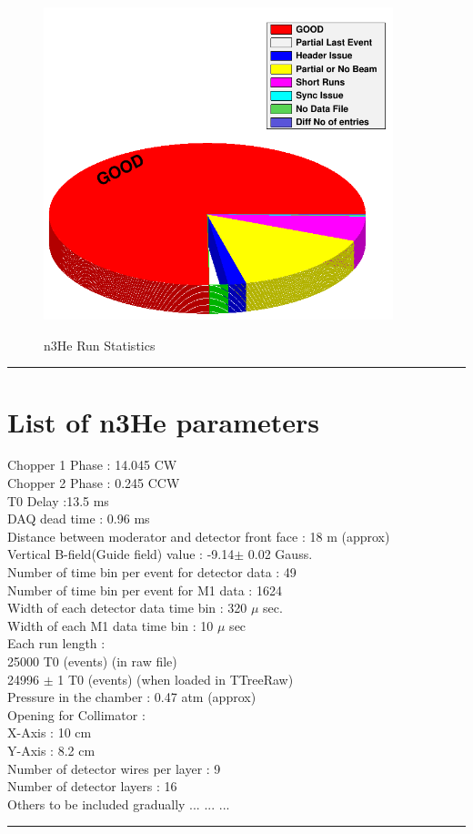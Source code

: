 \documentclass[12pt]{article}
\begin{document}
\begin{figure}[htb]
\centering
\includegraphics[width=4in]{n3he_run_status.png}\\
\caption{n3He Run Statistics}\label{f5}
\end{figure}   

\noindent
{\color{red} \rule{\linewidth}{1mm} }

\newpage
\section{List of n3He parameters}

Chopper 1 Phase : 14.045 CW \\
Chopper 2 Phase : 0.245 CCW \\
T0 Delay :13.5 ms \\
DAQ dead time : 0.96 ms \\
Distance between moderator and detector front face : 18 m (approx) \\
Vertical B-field(Guide field) value : -9.14$\pm$ 0.02 Gauss.\\
Number of time bin per event for detector data : 49\\
Number of time bin per event for M1 data : 1624\\
Width of each detector data time bin : 320 $\mu$ sec.\\
Width of each M1 data time bin : 10 $\mu$ sec\\
Each run length : \\
\hspace{5cm} 25000 T0 (events) (in raw file)\\
\hspace{5cm} 24996 $\pm$ 1 T0 (events) (when loaded in TTreeRaw)\\
Pressure in the chamber : 0.47 atm (approx) \\
Opening for Collimator :  \\
\hspace{5cm} X-Axis : 10 cm \\
\hspace{5cm} Y-Axis : 8.2 cm \\
Number of detector wires per layer : 9 \\
Number of detector layers : 16 \\


Others to be included gradually ... ... ... \\



\noindent
{\color{red} \rule{\linewidth}{1mm} }
\end{document}
